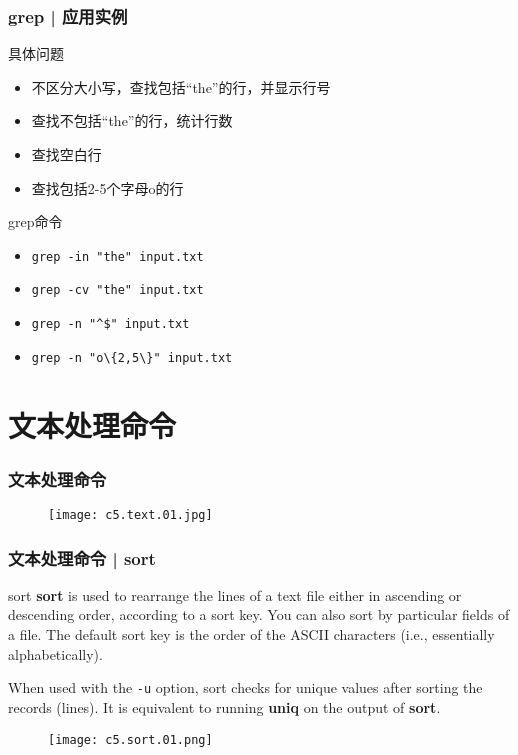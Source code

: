 \begin{frame}[fragile]
  \frametitle{grep | \alert{应用实例}}
  \begin{block}{具体问题}
    \begin{itemize}
      \item<2-> 不区分大小写，查找包括“the”的行，并显示行号
      \item<4-> 查找不包括“the”的行，统计行数
      \item<6-> 查找空白行
      \item<8-> 查找包括2-5个字母o的行
    \end{itemize}
  \end{block}
  \begin{block}{grep命令}
    \begin{itemize}
      \item<3-> \verb|grep -in "the" input.txt|
      \item<5-> \verb|grep -cv "the" input.txt|
      \item<7-> \verb|grep -n "^$" input.txt|
      \item<9-> \verb|grep -n "o\{2,5\}" input.txt|
    \end{itemize}
  \end{block}
\end{frame}

\section{文本处理命令}
\begin{frame}
  \frametitle{\alert{文本处理命令}}
  \begin{figure}
    \centering
    \texttt{[image: c5.text.01.jpg]}
  \end{figure}
\end{frame}

\begin{frame}[fragile]
  \frametitle{文本处理命令 | sort}
  \begin{block}{sort}
    \textbf{sort} is used to rearrange the lines of a text file either in ascending or descending order, according to a sort key. You can also sort by particular fields of a file. The default sort key is the order of the ASCII characters (i.e., essentially alphabetically).

    When used with the \verb|-u| option, sort checks for unique values after sorting the records (lines). It is equivalent to running \textbf{uniq} on the output of \textbf{sort}.
  \end{block}
  \pause
  \begin{figure}
    \centering
    \texttt{[image: c5.sort.01.png]}
  \end{figure}
\end{frame}

